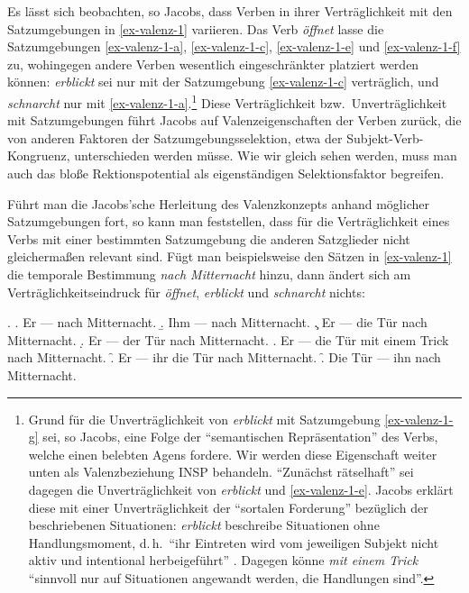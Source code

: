 Es lässt sich beobachten, so Jacobs, dass Verben in ihrer Verträglichkeit mit den Satzumgebungen in \ref{ex-valenz-1} variieren. Das Verb {\it öffnet} lasse die Satzumgebungen \ref{ex-valenz-1-a}, \ref{ex-valenz-1-c}, \ref{ex-valenz-1-e} und \ref{ex-valenz-1-f} zu, wohingegen andere Verben wesentlich eingeschränkter platziert werden können: {\it erblickt} sei nur mit der Satzumgebung \ref{ex-valenz-1-c} verträglich, und {\it schnarcht} nur mit \ref{ex-valenz-1-a}.\footnote{Grund für die Unverträglichkeit von {\it erblickt} mit Satzumgebung \ref{ex-valenz-1-g} sei, so Jacobs, eine Folge der "`semantischen Repräsentation"' des Verbs, welche einen belebten Agens fordere. Wir werden diese Eigenschaft weiter unten als Valenzbeziehung INSP behandeln. "`Zunächst rätselhaft"' sei dagegen die Unverträglichkeit von {\it erblickt} und \ref{ex-valenz-1-e}. Jacobs erklärt diese mit einer Unverträglichkeit der "`sortalen Forderung"' bezüglich der beschriebenen Situationen: {\it erblickt} beschreibe Situationen ohne Handlungsmoment, d.\,h.\ "`ihr Eintreten wird vom jeweiligen Subjekt nicht aktiv und intentional herbeigeführt"' \citep[382]{Jacobs:03}. Dagegen könne {\it mit einem Trick} "`sinnvoll nur auf Situationen angewandt werden, die Handlungen sind"'.} Diese Verträglichkeit bzw.\ Unverträglichkeit mit Satzumgebungen führt Jacobs auf Valenzeigenschaften der Verben zurück, die von anderen Faktoren der Satzumgebungsselektion, etwa der Subjekt-Verb-Kongruenz, unterschieden werden müsse. Wie wir gleich sehen werden, muss man auch das blo\ss e Rektionspotential als eigenständigen Selektionsfaktor begreifen. 

Führt man die Jacobs'sche Herleitung des Valenzkonzepts anhand möglicher Satzumgebungen fort, so kann man feststellen, dass für die Verträglichkeit eines Verbs mit einer bestimmten Satzumgebung die anderen Satzglieder nicht gleicherma\ss en relevant sind. Fügt man beispielsweise den Sätzen in \ref{ex-valenz-1} die temporale Bestimmung {\it nach Mitternacht} hinzu, dann ändert sich am Verträglichkeitseindruck für {\it öffnet}, {\it erblickt} und {\it schnarcht} nichts:

\ex. \label{ex-valenz-2}
\a. \label{ex-valenz-2-a} Er --- nach Mitternacht.
\b. \label{ex-valenz-2-b} Ihm --- nach Mitternacht.
\c. \label{ex-valenz-2-c} Er --- die Tür nach Mitternacht.
\d. \label{ex-valenz-2-d} Er --- der Tür nach Mitternacht.
\e. \label{ex-valenz-2-e} Er --- die Tür mit einem Trick nach Mitternacht.
\f. \label{ex-valenz-2-f} Er --- ihr die Tür nach Mitternacht.
\f. \label{ex-valenz-2-g} Die Tür --- ihn nach Mitternacht.

